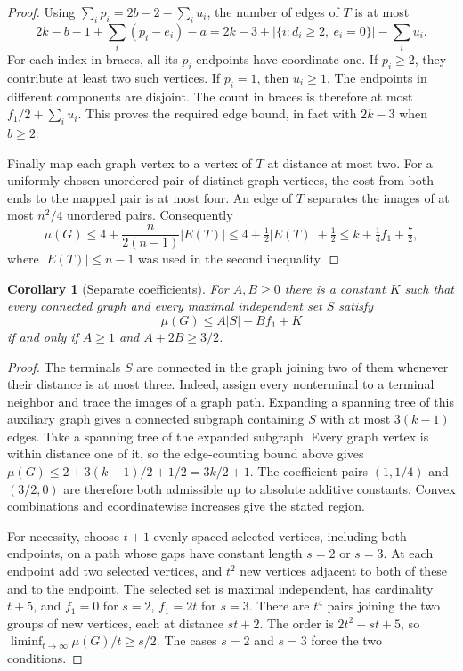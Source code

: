 \documentclass[11pt,a4paper]{article}
\newtheorem{corollary}[theorem]{Corollary}
\theoremstyle{remark}\newtheorem*{remark}{Remark}
\begin{document}
\begin{proof}
Using $\sum_i p_i=2b-2-\sum_i u_i$, the number of edges of $T$ is
at most
\[
 2k-b-1+\sum_i(p_i-e_i)-a
 =2k-3+|\{i:d_i\ge2,\ e_i=0\}|-\sum_i u_i .
\]
For each index in braces, all its $p_i$ endpoints have coordinate
one. If $p_i\ge2$, they contribute at least two such vertices.
If $p_i=1$, then $u_i\ge1$. The endpoints in different components
are disjoint. The count in braces is therefore at most
$f_1/2+\sum_i u_i$. This proves the required edge bound, in fact
with $2k-3$ when $b\ge2$.

Finally map each graph vertex to a vertex of $T$ at distance at most
two. For a uniformly chosen unordered pair of distinct graph vertices,
the cost from both ends to the mapped pair is at most four.
An edge of $T$ separates the images of at most $n^2/4$ unordered pairs.
Consequently
\[
 \mu(G)\le4+\frac{n}{2(n-1)}|E(T)|
 \le4+\tfrac12|E(T)|+\tfrac12
 \le k+\tfrac14 f_1+\tfrac72 ,
\]
where $|E(T)|\le n-1$ was used in the second inequality.
\end{proof}

\begin{corollary}[Separate coefficients]\label{cor:ninety-cone}
For $A,B\ge0$ there is a constant $K$ such that every connected graph
and every maximal independent set $S$ satisfy
\[
  \mu(G)\le A|S|+Bf_1+K
\]
if and only if $A\ge1$ and $A+2B\ge3/2$.
\end{corollary}
\begin{proof}
The terminals $S$ are connected in the graph joining two of them
whenever their distance is at most three. Indeed, assign every
nonterminal to a terminal neighbor and trace the images of a graph
path. Expanding a spanning tree of this auxiliary graph gives a
connected subgraph containing $S$ with at most $3(k-1)$ edges.
Take a spanning tree of the expanded subgraph. Every graph vertex
is within distance one of it, so the edge-counting bound above
gives $\mu(G)\le 2+3(k-1)/2+1/2=3k/2+1$.
The coefficient pairs $(1,1/4)$ and $(3/2,0)$ are therefore both
admissible up to absolute additive constants. Convex combinations
and coordinatewise increases give the stated region.

For necessity, choose $t+1$ evenly spaced selected vertices, including
both endpoints, on a path whose gaps have constant length $s=2$ or
$s=3$. At each endpoint add two selected vertices, and $t^2$ new
vertices adjacent to both of these and to the endpoint. The selected
set is maximal independent, has cardinality $t+5$, and
$f_1=0$ for $s=2$, $f_1=2t$ for $s=3$. There are $t^4$ pairs
joining the two groups of new vertices, each at distance $st+2$.
The order is $2t^2+st+5$, so
$\liminf_{t\to\infty}\mu(G)/t\ge s/2$.
The cases $s=2$ and $s=3$ force the two conditions.
\end{proof}
\end{document}
